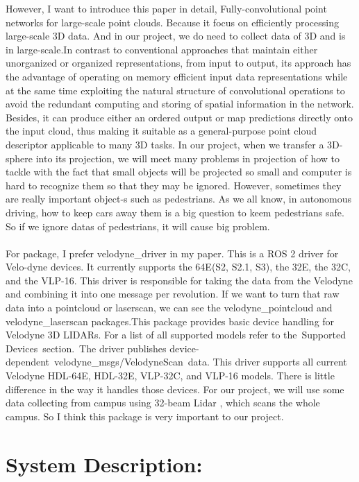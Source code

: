 \documentclass{article}
\begin{document}
\begin{normalsize}
\begin{itemize}
However, I want to introduce this paper in detail, Fully-convolutional point networks for large-scale point clouds. Because it focus on efficiently processing large-scale 3D data. And in our project, we do need to collect data of 3D and is in large-scale.In contrast to conventional approaches that maintain either unorganized or  organized representations, from input to output, its approach has the advantage of operating on memory efficient input data representations while at the same time exploiting the natural structure of convolutional operations to avoid the redundant computing and storing of spatial information in the network. Besides, it can produce either an ordered output or map predictions directly onto the input cloud,  thus making it suitable as a general-purpose point cloud descriptor applicable to many 3D tasks. In our project, when we transfer a 3D-sphere into its projection, we will meet many problems in projection of how to tackle with the fact that     small objects will be projected so small and computer is hard to recognize them  so that they may be ignored. However, sometimes they are really important object-s such as pedestrians. As we all know, in autonomous driving, how to keep cars away them is a big question to keem pedestrians safe. So if we ignore datas of pedestrians, it will cause big problem.
\\\\
For package, I prefer velodyne\_driver in my paper. This is a ROS 2 driver for Velo-dyne devices. It currently supports the 64E(S2, S2.1, S3), the 32E, the 32C, and the VLP-16. This driver is responsible for taking the data from the Velodyne and  combining it into one message per revolution. If we want to turn that raw data    into a pointcloud or laserscan, we can see the velodyne\_pointcloud and velodyne\_laserscan packages.This package provides basic device handling for Velodyne 3D LIDARs. For a list of all supported models refer to the Supported Devices section. The driver publishes device-dependent velodyne\_msgs/VelodyneScan data. This driver supports all current Velodyne HDL-64E, HDL-32E, VLP-32C, and VLP-16 models. There is little difference in the way it handles those devices. For our project,  we will use some data collecting from campus using 32-beam Lidar , which scans the whole campus. So I think this package is very important to our project.


\end{itemize}
        
    	\section{System Description:}
        

\end{normalsize}
\end{document}

